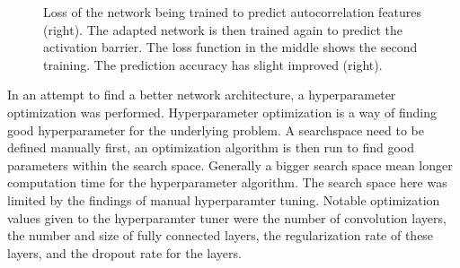 \begin{figure}[!htb]
    \endminipage
    \caption[LEFD transfer learning]{
    Loss of the network being trained to predict autocorrelation features (right).
    The adapted network is then trained again to predict the activation barrier. The loss function in the middle shows the second training.
    The prediction accuracy has slight improved (right).  
    }
    \label{fig:transfer_final}
\end{figure}

In an attempt to find a better network architecture, a hyperparameter optimization was performed.
Hyperparameter optimization is a way of finding good hyperparameter for the underlying problem.
A searchspace need to be defined manually first, an optimization algorithm is then run to find good parameters within the search space.
Generally a bigger search space mean longer computation time for the hyperparameter algorithm.
The search space here was limited by the findings of manual hyperparamter tuning.
Notable optimization values given to the hyperparamter tuner were the number of convolution layers, 
the number and size of fully connected layers, the regularization rate of these layers, and the dropout rate for the layers.


